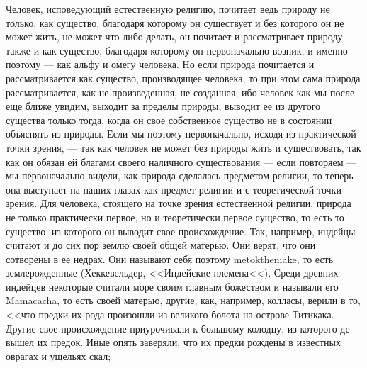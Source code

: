 \documentclass[12pt]{article}
\begin{document}
Человек, исповедующий естественную религию, почитает ведь природу не только, как существо, благодаря которому он существует и без которого он не может жить, не может что-либо делать, он почитает и рассматривает природу также и как существо, благодаря которому он первоначально возник, и именно поэтому --- как альфу и омегу человека. Но если природа почитается и рассматривается как существо, производящее человека, то при этом сама природа рассматривается, как не произведенная, не созданная; ибо человек как мы после еще ближе увидим, выходит за пределы природы, выводит ее из другого существа только тогда, когда он свое собственное существо не в состоянии объяснять из природы. Если мы поэтому первоначально, исходя из практической точки зрения, --- так как человек не может без природы жить и существовать, так как он обязан ей благами своего наличного существования --- если повторяем --- мы первоначально видели, как природа сделалась предметом религии, то теперь она выступает на наших глазах как предмет религии и с теоретической точки зрения. Для человека, стоящего на точке зрения естественной религии, природа не только практически первое, но и теоретически первое существо, то есть то существо, из которого он выводит свое происхождение. Так, например, индейцы считают и до сих пор землю своей общей матерью. Они верят, что они сотворены в ее недрах. Они называют себя поэтому metoktheniake, то есть землерожденные (Хеккевельдер, <<Индейские племена<<). Среди древних индейцев некоторые считали море своим главным божеством и называли его Mamacacha, то есть своей матерью, другие, как, например, колласы, верили в то, <<что предки их рода произошли из великого болота на острове Титикака. Другие свое происхождение приурочивали к большому колодцу, из которого-де вышел их предок. Иные опять заверяли, что их предки рождены в известных оврагах и ущельях скал; 
\end{document}
